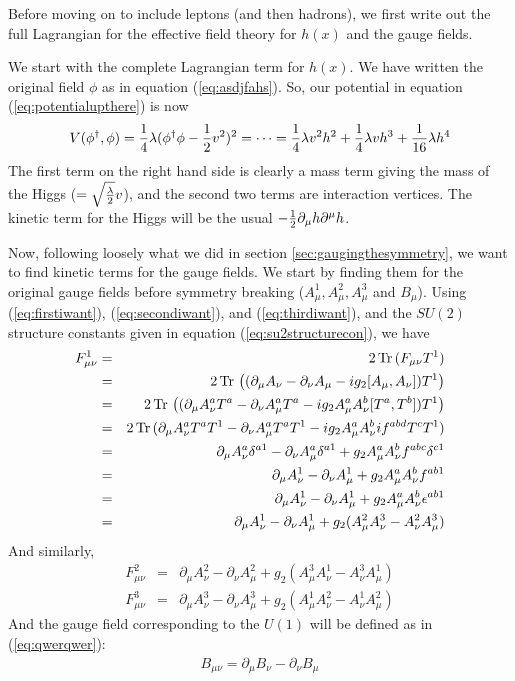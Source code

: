 \documentclass[12pt,epsf]{article}
\def\nolabel{\nonumber }
\def\nolabel{\nonumber }
\def\Tr{\mathop{\rm Tr \,} \nolimits}
\begin{document}
Before moving on to include leptons (and then hadrons), we first write
out the full Lagrangian for the effective field theory for $h(x)$ and
the gauge fields.  

We start with the complete Lagrangian term for $h(x)$.	We have written
the original field $\phi$ as in equation (\ref{eq:asdjfahs}).  So, our
potential in equation (\ref{eq:potentialupthere}) is now
\begin{eqnarray}
V(\phi^{\dagger},\phi) = {1\over 4} \lambda (\phi^{\dagger}\phi -
{1\over 2}v^2)^2 = \cdots = {1\over 4}\lambda v^2h^2 + {1\over
4}\lambda v h^3 + {1\over 16}\lambda h^4\nolabel
\end{eqnarray}
The first term on the right hand side is clearly a mass term giving the
mass of the Higgs ($=\sqrt{{\lambda \over 2}}v$), and the second two
terms are interaction vertices.  The kinetic term for the Higgs will be
the usual $-{1\over 2} \partial_{\mu}h \partial^{\mu}h$.  

Now, following loosely what we did in section
\ref{sec:gaugingthesymmetry}, we want to find kinetic terms for the
gauge fields.  We start by finding them for the original gauge fields
before symmetry breaking ($A^1_{\mu},A^2_{\mu},A^3_{\mu}$ and
$B_{\mu}$).  Using (\ref{eq:firstiwant}), (\ref{eq:secondiwant}), and
(\ref{eq:thirdiwant}), and the $SU(2)$ structure constants given in
equation (\ref{eq:su2structurecon}), we have
\begin{eqnarray}
F^1_{\mu \nu} &=& 2 \Tr(F_{\mu \nu}T^1) \nolabel \\
&=& 2 \Tr\big((\partial_{\mu}A_{\nu}-\partial_{\nu}A_{\mu} -
ig_2[A_{\mu},A_{\nu}])T^1\big) \nolabel \\
&=& 2\Tr\big((\partial_{\mu}A^a_{\nu}T^a - \partial_{\nu}A^a_{\mu}T^a -
ig_2A^a_{\mu}A^b_{\nu}[T^a,T^b])T^1\big) \nolabel \\
&=& 2\Tr(\partial_{\mu}A^a_{\nu}T^aT^1 - \partial_{\nu}A^a_{\mu}T^aT^1 -
ig_2A^a_{\mu}A^b_{\nu}if^{abd}T^cT^1) \nolabel \\
&=& \partial_{\mu}A^a_{\nu}\delta^{a1} -
\partial_{\nu}A^a_{\mu}\delta^{a1}+g_2A^a_{\mu}
A^b_{\nu}f^{abc}\delta^{c1} \nolabel \\
&=& \partial_{\mu}A^1_{\nu}-\partial_{\nu}A^1_{\mu}+
g_2A^a_{\mu}A^b_{\nu}f^{ab1} \nolabel \\
&=& \partial_{\mu}A^1_{\nu}-\partial_{\nu}A^1_{\mu}+
g_2A^a_{\mu}A^b_{\nu}\epsilon^{ab1} \nolabel \\
&=& \partial_{\mu}A^1_{\nu}-\partial_{\nu}A^1_{\mu}+
g_2(A^2_{\mu}A^3_{\nu} - A^2_{\nu}A^3_{\mu}) \nolabel
\end{eqnarray}
And similarly,
\begin{eqnarray}
F^2_{\mu \nu} &=& \partial_{\mu}A^2_{\nu} - \partial_{\nu}A^2_{\mu} +
g_2(A^3_{\mu}A^1_{\nu} - A^3_{\nu}A^1_{\mu})\nolabel \\
F^3_{\mu \nu} &=& \partial_{\mu}A^3_{\nu} - \partial_{\nu}A^3_{\mu} +
g_2(A^1_{\mu}A^2_{\nu} - A^1_{\nu}A^2_{\mu})\nolabel
\end{eqnarray}
And the gauge field corresponding to the $U(1)$ will be defined as in
(\ref{eq:qwerqwer}):
\begin{eqnarray}
B_{\mu \nu} = \partial_{\mu}B_{\nu} - \partial_{\nu}B_{\mu}\nolabel
\end{eqnarray}
\end{document}
